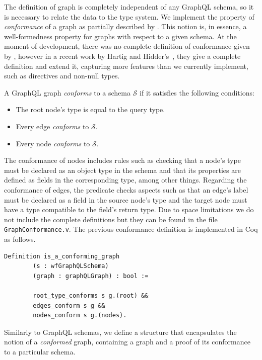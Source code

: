 The definition of graph is completely independent of any GraphQL schema, so it is necessary to relate the data to the type system. We implement the property of \textit{conformance}  of a graph as partially described by \HP{}. This notion is, in essence, a well-formedness property for graphs with respect to a given schema. At the moment of development, there was no complete definition of conformance given by \HP{}, however in a recent work by Hartig and Hidder's~\cite{olafschema}, they give a complete definition and extend it, capturing more features than we currently implement, such as directives and non-null types. 

\begin{definition}
A GraphQL graph \textit{conforms} to a schema $\mathcal{S}$ if it satisfies the following conditions:
\begin{itemize}
    \item The root node's type is equal to the query type.
    \item Every edge \textit{conforms} to $\mathcal{S}$.
    \item Every node \textit{conforms} to $\mathcal{S}$.
\end{itemize}
\end{definition}

The conformance of nodes includes rules such as checking that a node's type must be declared as an object type in the schema and that its properties are defined as fields in the corresponding type, among other things. 
Regarding the conformance of edges, the predicate checks aspects such as that an edge's label must be declared as a field in the source node's type and the target node must have a type compatible to the field's return type.
Due to space limitations we do not include the complete definitions but they can be found in the file \texttt{GraphConformance.v}. The previous conformance definition is implemented in Coq as follows.

\begin{verbatim}
Definition is_a_conforming_graph
        (s : wfGraphQLSchema)
        (graph : graphQLGraph) : bool :=

        root_type_conforms s g.(root) &&
        edges_conform s g &&
        nodes_conform s g.(nodes).
\end{verbatim}

Similarly to GraphQL schemas, we define a structure that encapsulates the notion of a \textit{conformed} graph, containing a graph and a proof of its conformance to a particular schema.

